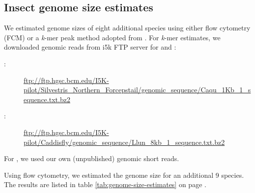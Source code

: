 \subsection{Insect genome size estimates}

We estimated genome sizes of eight additional species using either flow cytometry (FCM) or a \textit{k}-mer peak method adopted from \citep{Hozza2015}.
For \textit{k}-mer estimates, we downloaded genomic reads from i5k FTP server for  and :

\begin{description}
	\item[:] \url{ftp://ftp.hgsc.bcm.edu/I5K-pilot/Silvestris_Northern_Forcepstail/genomic_sequence/Caqu_1Kb_1_sequence.txt.bz2}
	\item[:] \url{ftp://ftp.hgsc.bcm.edu/I5K-pilot/Caddisfly/genomic_sequence/Llun_8kb_1_sequence.txt.bz2}
\end{description}

For , we used our own (unpublished) genomic short reads.

Using flow cytometry, we estimated the genome size for an additional 9 species. The results are listed in table \ref{tab:genome-size-estimates} on page \pageref{tab:genome-size-estimates}.

